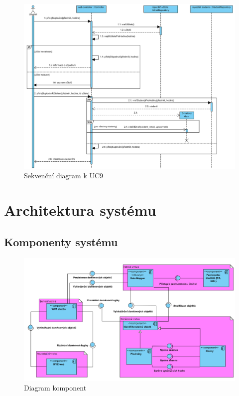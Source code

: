 \documentclass[a4paper,10pt,titlepage]{article}
\begin{document}
				\begin{figure}[H]
					\centering
							\includegraphics[width=\textwidth]{vis_sequence_diagram_uc9}
					\caption{Sekvenční diagram k UC9}
				\end{figure}
		\section{Architektura systému}
			\subsection{Komponenty systému}
					\begin{figure}[H]
						\centering
								\includegraphics[width=\textwidth]{vis_component_diagram}
						\caption{Diagram komponent}
					\end{figure}
\end{document}
